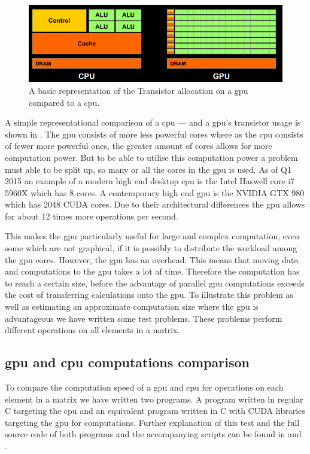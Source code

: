 \begin{figure}[h!]
\centering
 \includegraphics[width=1\textwidth]{figures/GPUCPUimage.png} %
\caption{A basic representation of the Transistor allocation on a \acrshort{gpu} compared to a \acrshort{cpu}. \citep{NvidiaCUDASeminar}}\label{image:gpucpuimage}
\vspace{-15pt}
\end{figure}

A simple representational comparison of a \acrshort{cpu} --- and a \acrshort{gpu}'s transistor usage is shown in .
The \acrshort{gpu} consists of more less powerful cores where as the \acrshort{cpu} consists of fewer more powerful ones, the greater amount of cores allows for more computation power.
But to be able to utilise this computation power a problem must able to be split up, so many or all the cores in the \acrshort{gpu} is used.
As of Q1 2015 an example of a modern high end desktop \acrshort{cpu} is the Intel Haswell core i7 5960X which has 8 cores. \citep{puget}
A contemporary high end \acrshort{gpu} is the NVIDIA GTX 980 which has 2048 CUDA cores. \citep{techpowerup,gtx980}
Due to their architectural differences the \acrshort{gpu} allows for about 12 times more operations per second.

This makes the \acrshort{gpu} particularly useful for large and complex computation, even some which are not graphical, if it is possibly to distribute the workload among the \acrshort{gpu} cores.
However, the \acrshort{gpu} has an overhead.
This means that moving data and computations to the \acrshort{gpu} takes a lot af time.
Therefore the computation has to reach a certain size, before the advantage of parallel \acrshort{gpu} computations exceeds the cost of transferring calculations onto the \acrshort{gpu}.
To illustrate this problem as well as estimating an approximate computation size where the \acrshort{gpu} is advantageous we have written some test problems. 
These problems perform different operations on all elements in a matrix. 

\subsection{\acrshort{gpu} and \acrshort{cpu} computations comparison}\label{subsec:gpuvscpuv1}
To compare the computation speed of a \acrshort{gpu} and \acrshort{cpu} for operations on each element in a matrix we have written two programs.
A program written in regular C targeting the \acrshort{cpu} and an equivalent program written in C with CUDA libraries targeting the \acrshort{gpu} for computations.
Further explanation of this test and the full source code of both programs and the accompanying scripts can be found in  and .

